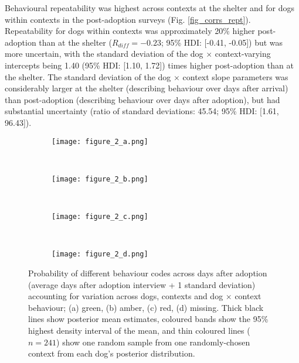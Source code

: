 \documentclass[12pt]{article}
\begin{document}
Behavioural repeatability was highest across contexts at the shelter and for dogs within contexts in the post-adoption surveys (Fig. \ref{fig_corrs_rept}). 
Repeatability for dogs within contexts was approximately 20\% higher post-adoption than at the shelter ($R_{diff} = -0.23$; 95\% HDI: [-0.41, -0.05]) but was more uncertain, with the standard deviation of the dog $\times$ context-varying intercepts being 1.40 (95\% HDI: [1.10, 1.72]) times higher post-adoption than at the shelter. The standard deviation of the dog $\times$ context slope parameters was considerably larger at the shelter (describing behaviour over days after arrival) than post-adoption (describing behaviour over days after adoption), but had substantial uncertainty (ratio of standard deviations: 45.54; 95\% HDI: [1.61, 96.43]).

\begin{figure}
  \hspace{-2cm}%
  \begin{subfigure}{0.4\textwidth}
    \centering
    \texttt{[image: figure\_2\_a.png]}
  \end{subfigure}%
  ~%
  \hspace{-2cm}
  \begin{subfigure}{0.4\textwidth}
    \centering
    \texttt{[image: figure\_2\_b.png]}
  \end{subfigure}%
  ~%
  \hspace{-2cm}
  \begin{subfigure}{0.4\textwidth}
    \centering
    \texttt{[image: figure\_2\_c.png]}
  \end{subfigure}%
  ~%
  \hspace{-2cm}
  \begin{subfigure}{0.4\textwidth}
    \centering
    \texttt{[image: figure\_2\_d.png]}
  \end{subfigure}%

  \caption{Probability of different behaviour codes across days after adoption (average days after adoption interview + 1 standard deviation) accounting for variation across dogs, contexts and dog $\times$ context behaviour; (a) green, (b) amber, (c) red, (d) missing. Thick black lines show posterior mean estimates, coloured bands show the 95\% highest density interval of the mean, and thin coloured lines ($n = 241$) show one random sample from one randomly-chosen context from each dog's posterior distribution.}
  \label{fig_adoption_behaviour}
\end{figure}
\end{document}
